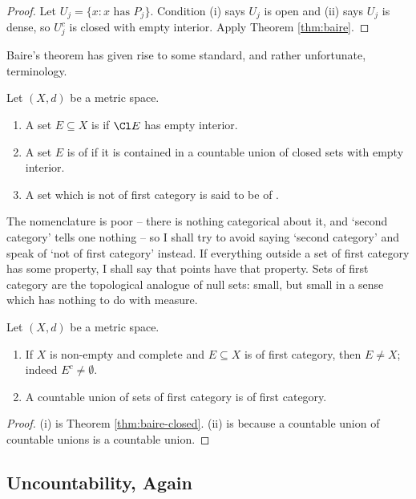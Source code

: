 \begin{proof}
	Let $U_j = \{x : x \text{ has } P_j\}$. Condition (i) says $U_j$ is open and (ii) says $U_j$ is dense, so $U_j^c$ is closed with empty interior. Apply Theorem \ref{thm:baire}.
\end{proof}

Baire's theorem has given rise to some standard, and rather unfortunate, terminology.

\begin{definition}[Category]
	Let $(X,d)$ be a metric space.
	\begin{enumerate}[label=(\roman*)]
		\item A set $E\subseteq X$ is  if $\Cl E$ has empty interior.
		\item A set $E$ is of  if it is contained in a countable union of closed sets with empty interior.
		\item A set which is not of first category is said to be of .
	\end{enumerate}
\end{definition}

The nomenclature is poor -- there is nothing categorical about it, and `second category' tells one nothing -- so I shall try to avoid saying `second category' and speak of `not of first category' instead. If everything outside a set of first category has some property, I shall say that  points have that property. Sets of first category are the topological analogue of null sets: small, but small in a sense which has nothing to do with measure.

\begin{lemma}\label{lem:first-cat}
	Let $(X,d)$ be a metric space.
	\begin{enumerate}[label=(\roman*)]
		\item If $X$ is non-empty and complete and $E\subseteq X$ is of first category, then $E\neq X$; indeed $E^c\neq\emptyset$.
		\item A countable union of sets of first category is of first category.
	\end{enumerate}
\end{lemma}

\begin{proof}
	(i) is Theorem \ref{thm:baire-closed}. (ii) is because a countable union of countable unions is a countable union.
\end{proof}

\subsection{Uncountability, Again}

